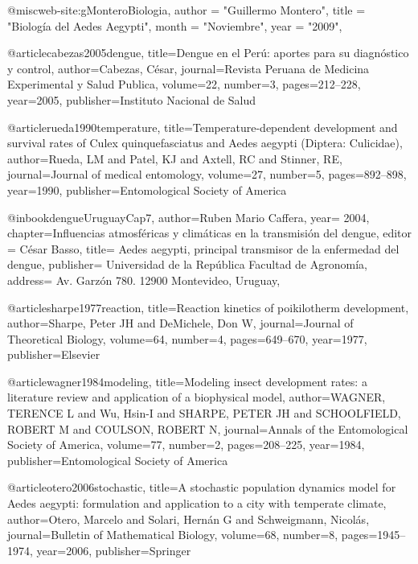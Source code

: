 @misc{web-site:gMonteroBiologia,
      author = "Guillermo Montero",
      title = "Biología del Aedes Aegypti",
      month = "Noviembre",
      year = "2009",
}

@article{cabezas2005dengue,
  title={Dengue en el Per{\'u}: aportes para su diagn{\'o}stico y control},
  author={Cabezas, C{\'e}sar},
  journal={Revista Peruana de Medicina Experimental y Salud Publica},
  volume={22},
  number={3},
  pages={212--228},
  year={2005},
  publisher={Instituto Nacional de Salud}
}

@article{rueda1990temperature,
  title={Temperature-dependent development and survival rates of Culex quinquefasciatus and Aedes aegypti (Diptera: Culicidae)},
  author={Rueda, LM and Patel, KJ and Axtell, RC and Stinner, RE},
  journal={Journal of medical entomology},
  volume={27},
  number={5},
  pages={892--898},
  year={1990},
  publisher={Entomological Society of America}
}

@inbook{dengueUruguayCap7,
  author={Ruben Mario Caffera},
  year= 2004, 
  chapter={Influencias atmosféricas y climáticas en la transmisión del dengue}, 
  editor = {César Basso}, 
  title= {Aedes aegypti, principal transmisor de la enfermedad del dengue}, 
  publisher= {Universidad de la República Facultad de Agronomía},
  address= {Av. Garzón 780. 12900 Montevideo, Uruguay}, 
}

@article{sharpe1977reaction,
  title={Reaction kinetics of poikilotherm development},
  author={Sharpe, Peter JH and DeMichele, Don W},
  journal={Journal of Theoretical Biology},
  volume={64},
  number={4},
  pages={649--670},
  year={1977},
  publisher={Elsevier}
}

@article{wagner1984modeling,
  title={Modeling insect development rates: a literature review and application of a biophysical model},
  author={WAGNER, TERENCE L and Wu, Hsin-I and SHARPE, PETER JH and SCHOOLFIELD, ROBERT M and COULSON, ROBERT N},
  journal={Annals of the Entomological Society of America},
  volume={77},
  number={2},
  pages={208--225},
  year={1984},
  publisher={Entomological Society of America}
}

@article{otero2006stochastic,
  title={A stochastic population dynamics model for Aedes aegypti: formulation and application to a city with temperate climate},
  author={{Otero}, {Marcelo and Solari, Hern{\'a}n G and Schweigmann, Nicol{\'a}s}},
  journal={Bulletin of Mathematical Biology},
  volume={68},
  number={8},
  pages={1945--1974},
  year={2006},
  publisher={Springer}
}

